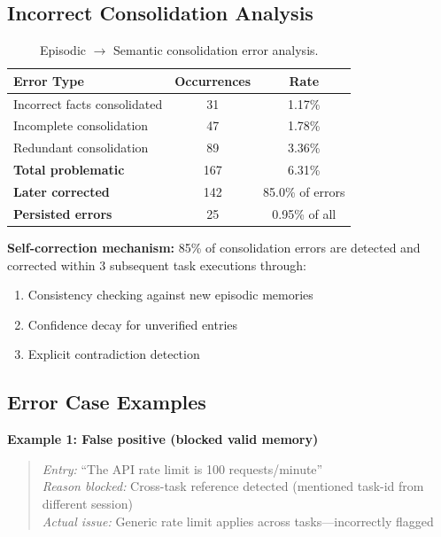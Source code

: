 \documentclass{article}
\theoremstyle{plain}
\theoremstyle{definition}
\theoremstyle{remark}
\begin{document}
\subsection{Incorrect Consolidation Analysis}

\begin{table}[h]
\centering
\caption{Episodic $\to$ Semantic consolidation error analysis.}
\label{tab:consolidation-errors}
\small
\begin{tabular}{lcc}
\toprule
\textbf{Error Type} & \textbf{Occurrences} & \textbf{Rate} \\
\midrule
Incorrect facts consolidated & 31 & 1.17\% \\
Incomplete consolidation & 47 & 1.78\% \\
Redundant consolidation & 89 & 3.36\% \\
\midrule
\textbf{Total problematic} & 167 & 6.31\% \\
\textbf{Later corrected} & 142 & 85.0\% of errors \\
\textbf{Persisted errors} & 25 & 0.95\% of all \\
\bottomrule
\end{tabular}
\end{table}

\textbf{Self-correction mechanism:} 85\% of consolidation errors are detected and corrected within 3 subsequent task executions through:
\begin{enumerate}[nosep,leftmargin=*]
\item Consistency checking against new episodic memories
\item Confidence decay for unverified entries
\item Explicit contradiction detection
\end{enumerate}

\subsection{Error Case Examples}

\textbf{Example 1: False positive (blocked valid memory)}
\begin{quote}
\small
\textit{Entry:} ``The API rate limit is 100 requests/minute'' \\
\textit{Reason blocked:} Cross-task reference detected (mentioned task-id from different session) \\
\textit{Actual issue:} Generic rate limit applies across tasks---incorrectly flagged
\end{quote}
\end{document}
